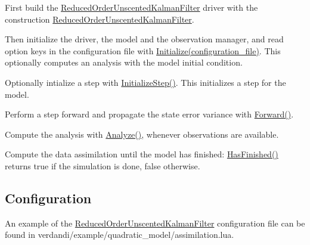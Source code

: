 \documentclass{tufte-book}
\begin{document}
\begin{DoxyEnumerate}
\item \-First build the {\ttfamily  \hyperlink{class_verdandi_1_1_reduced_order_unscented_kalman_filter}{\-Reduced\-Order\-Unscented\-Kalman\-Filter}} driver with the construction {\ttfamily  \hyperlink{class_verdandi_1_1_reduced_order_unscented_kalman_filter_a129b504d575fffcb3c8bb24485838e16}{\-Reduced\-Order\-Unscented\-Kalman\-Filter}}.


\item \-Then initialize the driver, the model and the observation manager, and read option keys in the configuration file with {\ttfamily  \hyperlink{class_verdandi_1_1_reduced_order_unscented_kalman_filter_aa482de38f62f8c9e6e270fa2ce20e49b}{\-Initialize(configuration\-\_\-file)}}. \-This optionally computes an analysis with the model initial condition.


\item \-Optionally intialize a step with {\ttfamily  \hyperlink{class_verdandi_1_1_reduced_order_unscented_kalman_filter_a528987dfbba5343306aa83f055ba1aa5}{\-Initialize\-Step()}}. \-This initializes a step for the model.


\item \-Perform a step forward and propagate the state error variance with {\ttfamily  \hyperlink{class_verdandi_1_1_reduced_order_unscented_kalman_filter_a79767d20f8601c31877c3b457d08ce32}{\-Forward()}}.


\item \-Compute the analysis with {\ttfamily  \hyperlink{class_verdandi_1_1_reduced_order_unscented_kalman_filter_a10d2c0b27b731bfcb28210e0128368fe}{\-Analyze()}}, whenever observations are available.


\item \-Compute the data assimilation until the model has finished\-: {\ttfamily  \hyperlink{class_verdandi_1_1_reduced_order_unscented_kalman_filter_a35178086b2ceab0231a912b7208c4e67}{\-Has\-Finished()}} returns true if the simulation is done, false otherwise.
\end{DoxyEnumerate}





  \hypertarget{roukf_configuration}{}\subsection{\-Configuration}\label{roukf_configuration}

 An example of the  {\ttfamily  \hyperlink{class_verdandi_1_1_reduced_order_unscented_kalman_filter}{\-Reduced\-Order\-Unscented\-Kalman\-Filter}} configuration file can be found in  {\ttfamily verdandi/example/quadratic\_model/assimilation.lua}.
\end{document}
